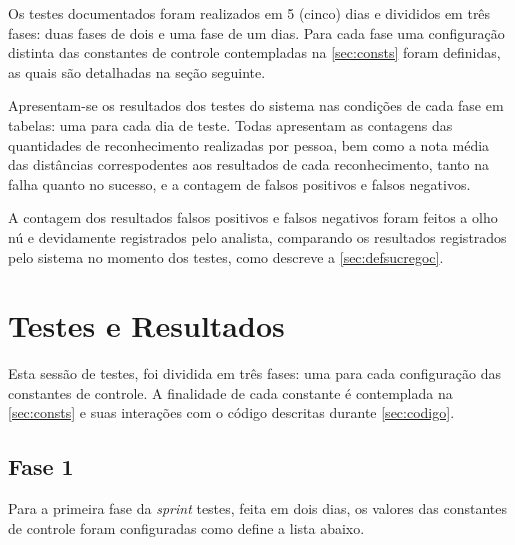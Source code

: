 Os testes documentados foram realizados em 5 (cinco) dias e divididos em três fases: duas fases de dois e uma fase de um dias. Para cada fase uma configuração distinta das constantes de controle contempladas na \autoref{sec:consts} foram definidas, as quais são detalhadas na seção seguinte.

Apresentam-se os resultados dos testes do sistema nas condições de cada fase em tabelas: uma para cada dia de teste. Todas apresentam as contagens das quantidades de reconhecimento realizadas por pessoa, bem como a nota média das distâncias correspodentes aos resultados de cada reconhecimento, tanto na falha quanto no sucesso, e a contagem de falsos positivos e falsos negativos.

A contagem dos resultados falsos positivos e falsos negativos foram feitos a olho nú e devidamente registrados pelo analista, comparando os resultados registrados pelo sistema no momento dos testes, como descreve a \autoref{sec:defsucregoc}.

\section{Testes e Resultados}\label{ch:testresult}

Esta sessão de testes, foi dividida em três fases: uma para cada configuração das constantes de controle. A finalidade de cada constante é contemplada na \autoref{sec:consts} e suas interações com o código descritas durante \autoref{sec:codigo}.


\subsection{Fase 1}\label{ch:testresultfaz1}
Para a primeira fase da \textit{sprint} testes, feita em dois dias, os valores das constantes de controle foram configuradas como define a lista abaixo.

